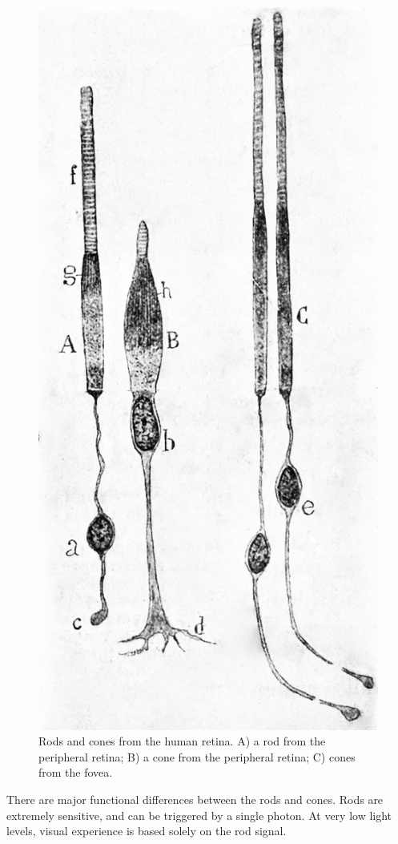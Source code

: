 \begin{figure}

{\centering \includegraphics[width=0.7\linewidth]{./figures/visual/PhotorecptorsCajalManual} 

}

\caption{Rods and cones from the human retina. A) a rod from the peripheral retina; B) a cone from the peripheral retina; C) cones from the fovea.}\label{fig:photoreceptors}
\end{figure}

There are major functional differences between the rods and cones. Rods are extremely sensitive, and can be triggered by a single photon. At very low light levels, visual experience is based solely on the rod signal.

